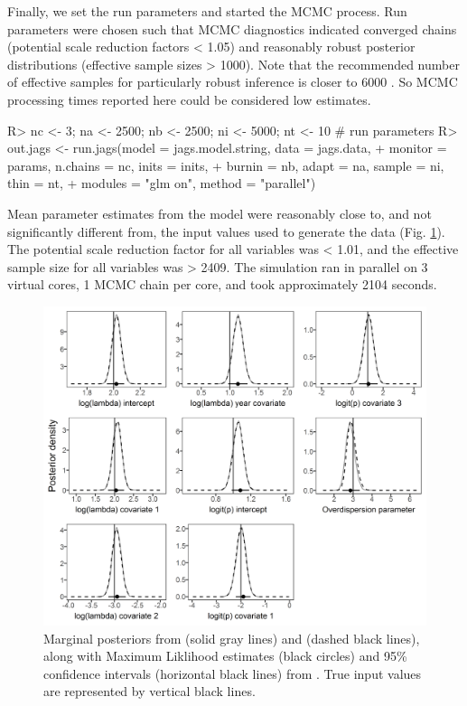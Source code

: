 \documentclass[article]{jss}
\begin{document}
Finally, we set the run parameters and started the MCMC process. Run parameters were chosen such that MCMC diagnostics indicated converged chains (potential scale reduction factors < 1.05) and reasonably robust posterior distributions (effective sample sizes > 1000). Note that the recommended number of effective samples for particularly robust inference is closer to 6000 \citep{Gong_Flegal_2016}. So MCMC processing times reported here could be considered low estimates.

\begin{CodeInput}
R> nc <- 3; na <- 2500; nb <- 2500; ni <- 5000; nt <- 10 # run parameters
R> out.jags <- run.jags(model = jags.model.string, data = jags.data,
+                       monitor = params, n.chains = nc, inits = inits,
+                       burnin = nb, adapt = na, sample = ni, thin = nt,
+                       modules = "glm on", method = "parallel")
\end{CodeInput}

Mean parameter estimates from the  model were reasonably close to, and not significantly different from, the input values used to generate the data (Fig. \ref{fig:fig1}). The potential scale reduction factor for all variables was < 1.01, and the effective sample size for all variables was > 2409. The simulation ran in parallel on 3 virtual cores, 1 MCMC chain per core, and took approximately 2104 seconds.

\begin{figure}
  \includegraphics[width=\linewidth]{fig1.png}
  \caption{Marginal posteriors from  (solid gray lines) and  (dashed black lines), along with Maximum Liklihood estimates (black circles) and 95\% confidence intervals (horizontal black lines) from .  True input values are represented by vertical black lines.}
  \label{fig:fig1}
\end{figure}
\end{document}

